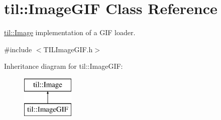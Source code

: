 \hypertarget{classtil_1_1_image_g_i_f}{
\section{til::ImageGIF Class Reference}
\label{classtil_1_1_image_g_i_f}
}


\hyperlink{classtil_1_1_image}{til::Image} implementation of a GIF loader.  




{\ttfamily \#include $<$TILImageGIF.h$>$}

Inheritance diagram for til::ImageGIF:\begin{figure}[H]
\begin{center}
\leavevmode
\includegraphics[height=2.000000cm]{classtil_1_1_image_g_i_f}
\end{center}
\end{figure}
